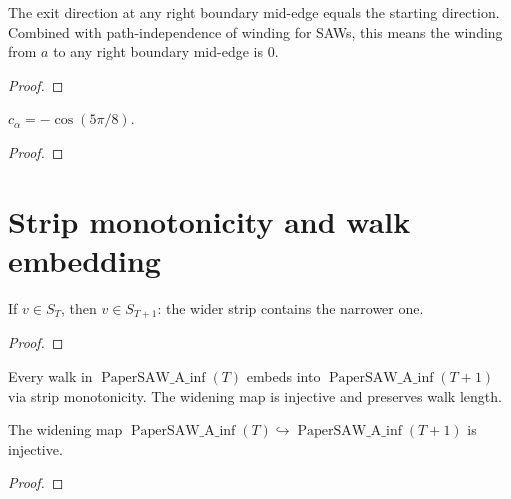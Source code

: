 \begin{lemma}[Right boundary winding = 0]\label{lem:right_winding}
\leanok
{}
  The exit direction at any right boundary mid-edge equals the starting
  direction. Combined with path-independence of winding for SAWs, this means
  the winding from $a$ to any right boundary mid-edge is $0$.
\end{lemma}
\begin{proof}
\leanok
\end{proof}

\begin{lemma}\label{lem:c_alpha_cos}
\leanok
{}
  $c_\alpha = -\cos(5\pi/8)$.
\end{lemma}
\begin{proof}
\leanok
\end{proof}

\section{Strip monotonicity and walk embedding}\label{sec:strip_mono}

\begin{lemma}\label{lem:strip_mono}
\leanok
{}
  If $v \in S_T$, then $v \in S_{T+1}$: the wider strip contains the narrower one.
\end{lemma}
\begin{proof}
\leanok
\end{proof}

\begin{definition}\label{def:walk_widen}
\leanok
{}
  Every walk in $\operatorname{PaperSAW\_A\_inf}(T)$ embeds into
  $\operatorname{PaperSAW\_A\_inf}(T{+}1)$ via strip monotonicity.
  The widening map is injective and preserves walk length.
\end{definition}

\begin{lemma}\label{lem:widen_inj}
\leanok
{}
  The widening map $\operatorname{PaperSAW\_A\_inf}(T) \hookrightarrow
  \operatorname{PaperSAW\_A\_inf}(T{+}1)$ is injective.
\end{lemma}
\begin{proof}
\leanok
\end{proof}

